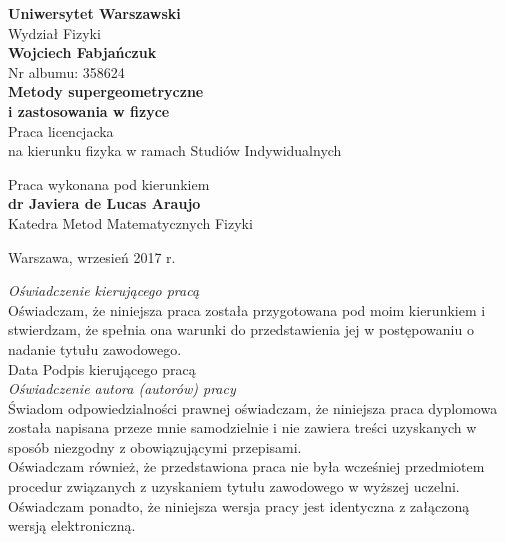 \documentclass[11pt,a4paper]{report}
\theoremstyle{definition}
\begin{document}
\begin{titlepage}
\begin{center}


\LARGE \textbf{Uniwersytet Warszawski}\\
\LARGE Wydział Fizyki\\[2cm]
\LARGE{\textbf{Wojciech Fabjańczuk}}\\
\LARGE{Nr albumu: 358624}\\[3cm]
\Huge \textbf{Metody supergeometryczne \\i zastosowania w fizyce}\\[3cm]
\Large Praca licencjacka\\
na kierunku fizyka w ramach Studiów Indywidualnych \\[2cm]

\end{center}
\begin{flushright}
\Large Praca wykonana pod kierunkiem\\
\textbf{dr Javiera de Lucas Araujo}\\
Katedra Metod Matematycznych Fizyki\\[3.5cm]
\end{flushright}
\begin{center}
\Large Warszawa, wrzesień 2017 r.
\end{center}
\end{titlepage}

\noindent\textit{Oświadczenie kierującego pracą}\\[0.25cm]
\textnormal{Oświadczam, że niniejsza praca została przygotowana pod moim kierunkiem i stwierdzam, że spełnia ona warunki do przedstawienia jej w postępowaniu o nadanie tytułu zawodowego.}\\[1cm]

\noindent \hspace{1cm} \textnormal{Data} \hspace{2cm} \textnormal{Podpis kierującego pracą}
\\[4cm]

\noindent \textit{Oświadczenie autora (autorów) pracy}\\[0.25cm]
\textnormal{Świadom odpowiedzialności prawnej oświadczam, że niniejsza praca dyplomowa została napisana przeze mnie samodzielnie i nie zawiera treści uzyskanych w sposób niezgodny z obowiązującymi przepisami.\\ Oświadczam również, że przedstawiona praca nie była wcześniej przedmiotem procedur związanych z uzyskaniem tytułu zawodowego w wyższej uczelni.\\ Oświadczam ponadto, że niniejsza wersja pracy jest identyczna z załączoną wersją elektroniczną.}\\[1cm]
\end{document}
